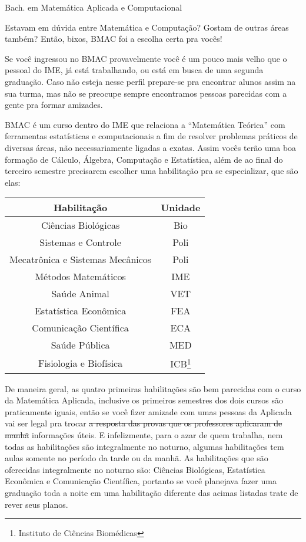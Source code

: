 \begin{subsecao}{Bach. em Matemática Aplicada e Computacional}

Estavam em dúvida entre Matemática e Computação? Gostam de outras áreas também?
Então, bixos, BMAC foi a escolha certa pra vocês!

Se você ingressou no BMAC provavelmente você é um pouco mais velho que o pessoal
do IME, já está trabalhando, ou está em busca de uma segunda graduação. Caso não
esteja nesse perfil prepare-se pra encontrar alunos assim na sua turma, mas não se
preocupe sempre encontramos pessoas parecidas com a gente pra formar amizades.

BMAC é um curso dentro do IME que relaciona a ``Matemática Teórica'' com
ferramentas estatísticas e computacionais a fim de resolver problemas práticos
de diversas áreas, não necessariamente ligadas a exatas. Assim vocês terão uma boa
formação de Cálculo, Álgebra, Computação e Estatística, além de ao final do terceiro
semestre precisarem escolher uma habilitação pra se especializar, que são elas:

\begin {center}
  \begin {tabular}{|c|c|}
    \hline
    Habilitação & Unidade \\
    \hline
    Ciências Biológicas & Bio\\
    Sistemas e Controle & Poli\\
    Mecatrônica e Sistemas Mecânicos & Poli\\
    Métodos Matemáticos & IME\\
    Saúde Animal & VET \\
    Estatística Econômica & FEA \\
    Comunicação Científica & ECA \\
    Saúde Pública & MED \\
    Fisiologia e Biofísica & ICB\footnote{Instituto de Ciências Biomédicas} \\
    \hline
  \end {tabular}
\end {center}

De maneira geral, as quatro primeiras habilitações são bem parecidas com o
curso da Matemática Aplicada, inclusive os primeiros semestres dos dois cursos
são praticamente iguais, então se você fizer amizade com umas pessoas da
Aplicada vai ser legal pra trocar \sout{a resposta das provas que os
professores aplicaram de manhã} informações úteis. E infelizmente, para o azar
de quem trabalha, nem todas as habilitações são integralmente no noturno,
algumas habilitações tem aulas somente no período da tarde ou da manhã. As
habilitações que são oferecidas integralmente no noturno são: Ciências
Biológicas, Estatística Econômica e Comunicação Científica, portanto se você
planejava fazer uma graduação toda a noite em uma habilitação diferente das
acimas listadas trate de rever seus planos.


\end{subsecao}
